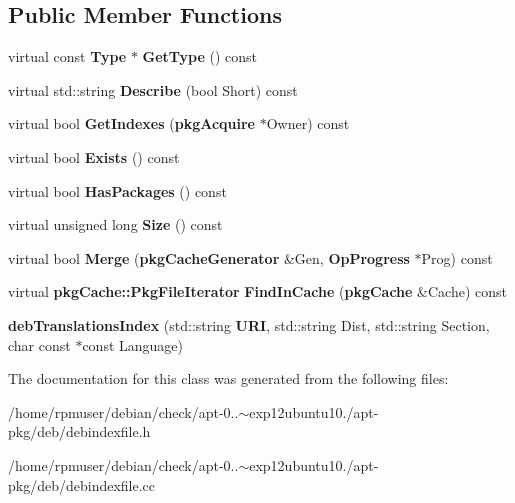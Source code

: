 \subsection*{\-Public \-Member \-Functions}
\begin{DoxyCompactItemize}
\item 
virtual const {\bf \-Type} $\ast$ {\bfseries \-Get\-Type} () const \label{classdebTranslationsIndex_a97e9791ce2bb129d7b03dfe2f55de366}

\item 
virtual std\-::string {\bfseries \-Describe} (bool \-Short) const \label{classdebTranslationsIndex_a1d76db0d4174d2926a4c5af85e1019d9}

\item 
virtual bool {\bfseries \-Get\-Indexes} ({\bf pkg\-Acquire} $\ast$\-Owner) const \label{classdebTranslationsIndex_a64ea3b4afff26cc8c99ac384788b4bb8}

\item 
virtual bool {\bfseries \-Exists} () const \label{classdebTranslationsIndex_aa746a17c5bebccb81d72dccb29948ec4}

\item 
virtual bool {\bfseries \-Has\-Packages} () const \label{classdebTranslationsIndex_a29ebd46dc004b08bed75df38862c6caa}

\item 
virtual unsigned long {\bfseries \-Size} () const \label{classdebTranslationsIndex_ab1050fe2604ef4e6cba6491de8a9f708}

\item 
virtual bool {\bfseries \-Merge} ({\bf pkg\-Cache\-Generator} \&\-Gen, {\bf \-Op\-Progress} $\ast$\-Prog) const \label{classdebTranslationsIndex_a7055ce0e05b5bcf6fad25971d5e3c9e4}

\item 
virtual {\bf pkg\-Cache\-::\-Pkg\-File\-Iterator} {\bfseries \-Find\-In\-Cache} ({\bf pkg\-Cache} \&\-Cache) const \label{classdebTranslationsIndex_afa0e20f879d9090dac2a7a4830bc7015}

\item 
{\bfseries deb\-Translations\-Index} (std\-::string {\bf \-U\-R\-I}, std\-::string \-Dist, std\-::string \-Section, char const $\ast$const \-Language)\label{classdebTranslationsIndex_a06f09f55991c66b5d420b1a51673be5c}

\end{DoxyCompactItemize}


\-The documentation for this class was generated from the following files\-:\begin{DoxyCompactItemize}
\item 
/home/rpmuser/debian/check/apt-\/0..$\sim$exp12ubuntu10./apt-\/pkg/deb/debindexfile.\-h\item 
/home/rpmuser/debian/check/apt-\/0..$\sim$exp12ubuntu10./apt-\/pkg/deb/debindexfile.\-cc\end{DoxyCompactItemize}
